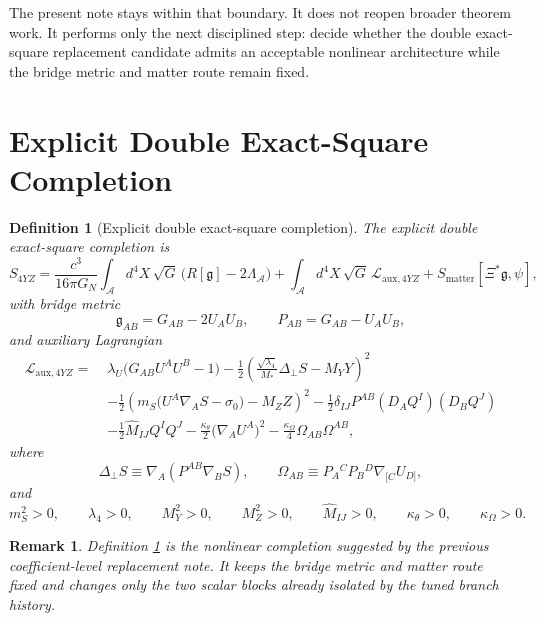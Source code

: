\documentclass[11pt]{article}
\newcommand{\Sub}{\mathcal{A}}
\newcommand{\BridgeMetric}{\mathfrak{g}}
\newtheorem{definition}{Definition}
\newtheorem{remark}{Remark}
\begin{document}
The present note stays within that boundary. It does not reopen broader theorem work. It performs only the next disciplined step: decide whether the double exact-square replacement candidate admits an acceptable nonlinear architecture while the bridge metric and matter route remain fixed.

\section{Explicit Double Exact-Square Completion}

\begin{definition}[Explicit double exact-square completion]
\label{def:S4YZ}
The \emph{explicit double exact-square completion} is
\begin{equation}
S_{4YZ}
=
\frac{c^3}{16\pi G_N}
\int_{\Sub} d^4X\,\sqrt{G}\,\bigl(R[\BridgeMetric]-2\Lambda_{\Sub}\bigr)
+\int_{\Sub} d^4X\,\sqrt{G}\,\mathcal L_{\mathrm{aux},4YZ}
+S_{\mathrm{matter}}[\Xi^*\BridgeMetric,\psi],
\label{eq:S4YZ}
\end{equation}
with bridge metric
\begin{equation}
\BridgeMetric_{AB}=G_{AB}-2U_AU_B,
\qquad
P_{AB}=G_{AB}-U_AU_B,
\label{eq:bridge}
\end{equation}
and auxiliary Lagrangian
\begin{align}
\mathcal L_{\mathrm{aux},4YZ}
=\;&
\lambda_U\bigl(G_{AB}U^AU^B-1\bigr)
-\frac12
\left(
\frac{\sqrt{\lambda_4}}{M_*}\Delta_\perp S-M_YY
\right)^2
\nonumber\\
&-\frac12
\left(
m_S\bigl(U^A\nabla_A S-\sigma_0\bigr)-M_ZZ
\right)^2
-\frac12\delta_{IJ}P^{AB}(D_AQ^I)(D_BQ^J)
\nonumber\\
&-\frac12\widehat M_{IJ}Q^IQ^J
-\frac{\kappa_\theta}{2}\bigl(\nabla_AU^A\bigr)^2
-\frac{\kappa_\Omega}{4}\Omega_{AB}\Omega^{AB},
\label{eq:L4YZ}
\end{align}
where
\begin{equation}
\Delta_\perp S\equiv \nabla_A\!\left(P^{AB}\nabla_BS\right),
\qquad
\Omega_{AB}\equiv P_A{}^CP_B{}^D\nabla_{[C}U_{D]},
\label{eq:defops}
\end{equation}
and
\begin{equation}
m_S^2>0,
\qquad
\lambda_4>0,
\qquad
M_Y^2>0,
\qquad
M_Z^2>0,
\qquad
\widehat M_{IJ}>0,
\qquad
\kappa_\theta>0,
\qquad
\kappa_\Omega>0.
\label{eq:positivity}
\end{equation}
\end{definition}

\begin{remark}
Definition \ref{def:S4YZ} is the nonlinear completion suggested by the previous coefficient-level replacement note. It keeps the bridge metric and matter route fixed and changes only the two scalar blocks already isolated by the tuned branch history.
\end{remark}
\end{document}
